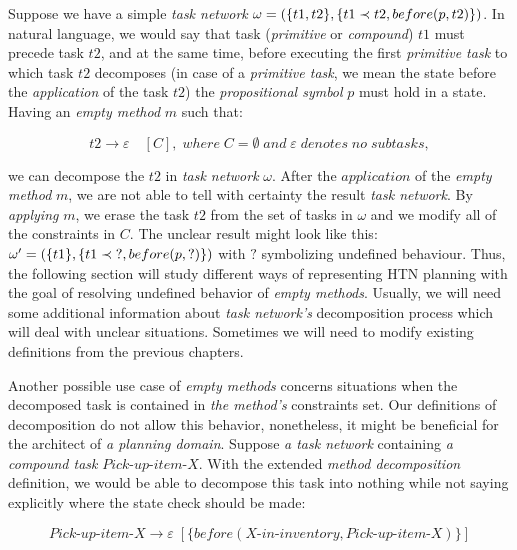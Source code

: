 \begin{example}\label{ex03:6}
    Suppose we have a simple \emph{task network} $\omega = (\{t1, t2\}, \{t1 \prec t2, \\ before(p, t2)\})$. In natural language, we would say that task (\emph{primitive} or \emph{compound}) $t1$ must precede task $t2$, and at the same time, before executing the first \emph{primitive task} to which task $t2$ decomposes (in case of a \emph{primitive task}, we mean the state before the \emph{application} of the task $t2$) the \emph{propositional symbol} $p$ must hold in a state. Having an \emph{empty method} $m$ such that:
    
    \[
        t2 \rightarrow \varepsilon \quad [C], \; where \; C = \emptyset \; and \; \varepsilon \; denotes \; no \; subtasks,
    \]
    
    \noindent
    we can decompose the $t2$ in \emph{task network} $\omega$. After the $application$ of the \emph{empty method} $m$, we are not able to tell with certainty the result \emph{task network}. By \emph{applying} $m$, we erase the task $t2$ from the set of tasks in $\omega$ and we modify all of the constraints in $C$. The unclear result might look like this: $\omega' = (\{t1\}, \{t1 \prec \; ?, \\ before(p, ?)\})$ with $?$ symbolizing undefined behaviour. Thus, the following section will study different ways of representing HTN planning with the goal of resolving undefined behavior of \emph{empty methods}. Usually, we will need some additional information about \emph{task network's} decomposition process which will deal with unclear situations. Sometimes we will need to modify existing definitions from the previous chapters.
\end{example}

\medskip\noindent
Another possible use case of \emph{empty methods} concerns situations when the decomposed task is contained in \emph{the method's} constraints set. Our definitions of decomposition do not allow this behavior, nonetheless, it might be beneficial for the architect of \emph{a planning domain}. Suppose \emph{a task network} containing \emph{a compound task} $Pick\text{-}up\text{-}item\text{-}X$. With the extended \emph{method decomposition} definition, we would be able to decompose this task into nothing while not saying explicitly where the state check should be made:

\[
    Pick\text{-}up\text{-}item\text{-}X \rightarrow \varepsilon \; [\{before(X\text{-}in\text{-}inventory, Pick\text{-}up\text{-}item\text{-}X)\}]
\]

